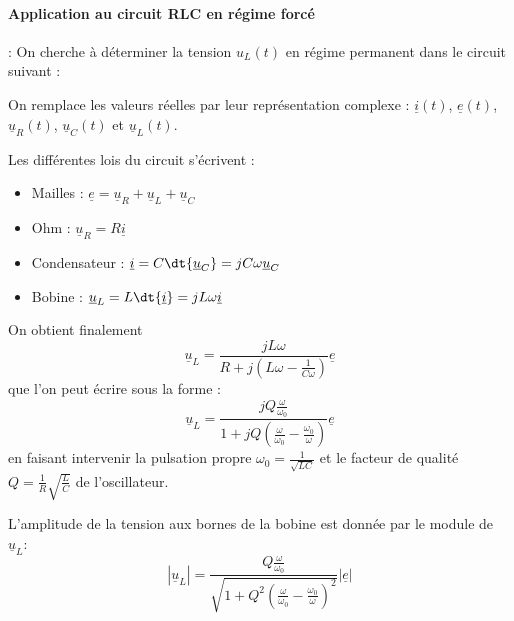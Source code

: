 \documentclass{cours}
\begin{document}
\paragraph{Application au circuit RLC en régime forcé } : On cherche à déterminer la tension $u_L(t)$ en régime permanent dans le circuit suivant :
\begin{center}
\end{center}

On remplace les valeurs réelles par leur représentation complexe : $\underline{i}(t)$, $\underline{e}(t)$, $\underline{u}_R(t)$, $\underline{u}_C(t)$ et $\underline{u}_L(t)$.

Les différentes lois du circuit s'écrivent :
\begin{itemize}
\item Mailles : $\underline{e}=\underline{u}_R+\underline{u}_L+\underline{u}_C$
\item Ohm : $\underline{u}_R=R\underline{i}$
\item Condensateur : $\underline{i}=C\dt{\underline{u}_C}=jC\omega \underline{u}_C$
\item Bobine : $\underline{u}_L=L\dt{\underline{i}}=jL\omega\underline{i}$
\end{itemize}
On obtient finalement 
\begin{equation*}
\underline{u}_L=\frac{jL\omega}{R+j \left(  L\omega - \frac{1}{C\omega}\right)} \underline{e}
\end{equation*}
que l'on peut écrire sous la forme :
\begin{equation*}
\underline{u}_L=\frac{jQ \frac{\omega}{\omega_0}}{1+jQ \left( \frac{\omega}{\omega_0}-\frac{\omega_0}{\omega} \right)}\underline{e}
\end{equation*}
en faisant intervenir la pulsation propre $\omega_0=\frac{1}{\sqrt{LC}}$ et le facteur de qualité $Q=\frac{1}{R}\sqrt{\frac{L}{C}}$ de l'oscillateur.

L'amplitude de la tension aux bornes de la bobine est donnée par le module de $\underline{u}_L$: 
\begin{equation}
|\underline{u}_L|=\frac{Q \frac{\omega}{\omega_0}}{\sqrt{1+Q^2 \left( \frac{\omega}{\omega_0}-\frac{\omega_0}{\omega} \right)^2}} |\underline{e}|
\end{equation}
\end{document}
